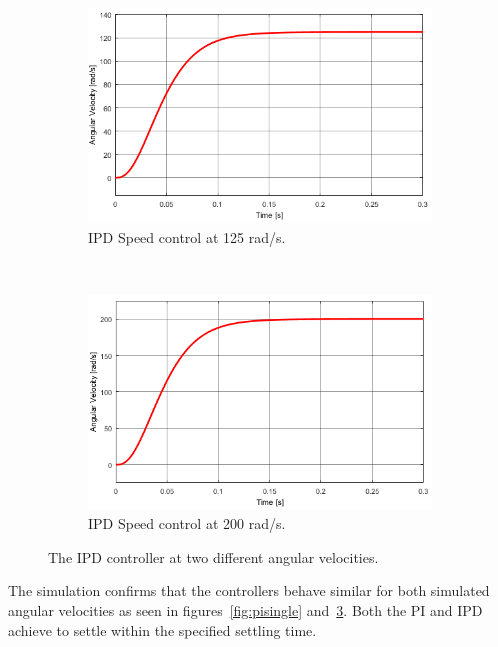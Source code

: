 \begin{figure}[h!]
	\centering
	\begin{subfigure}[b]{0.45\textwidth}
		\includegraphics[width=\textwidth]{graphics/IPD_single125}
		\caption{IPD Speed control at 125 rad/s.}
		\label{fig:ipdsingle125}
	\end{subfigure}
	~ %
	\begin{subfigure}[b]{0.45\textwidth}
		\includegraphics[width=\textwidth]{graphics/IPD_single200}
		\caption{IPD Speed control at 200 rad/s.}
		\label{fig:ipdsingle200}
	\end{subfigure}
	\caption{The IPD controller at two different angular velocities.}\label{fig:ipdsingle}
\end{figure}

The simulation confirms that the controllers behave similar for both simulated angular velocities as seen in figures~\ref{fig:pisingle} and~\ref{fig:ipdsingle}. Both the PI and IPD achieve to settle within the specified settling time.


